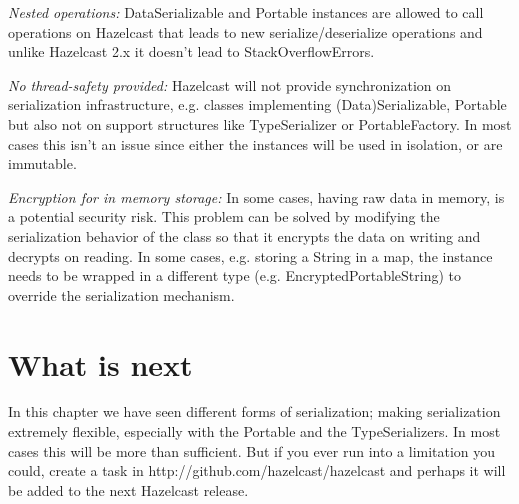 \emph{Nested operations:} DataSerializable and Portable instances are allowed to call operations on Hazelcast that leads to new serialize/deserialize operations and unlike Hazelcast 2.x it doesn't lead to StackOverflowErrors.

\emph{No thread-safety provided:} Hazelcast will not provide synchronization on serialization infrastructure, e.g. classes implementing (Data)Serializable, Portable but also not on support structures like TypeSerializer or PortableFactory. In most cases this isn't an issue since either the instances will be used in isolation, or are immutable.

\emph{Encryption for in memory storage:} In some cases, having raw data in memory, is a potential security risk. This problem can be solved by modifying the serialization behavior of the class so that it encrypts the data on writing and decrypts on reading. In some cases, e.g. storing a String in a map, the instance needs to be wrapped in a different type (e.g. EncryptedPortableString) to override the serialization mechanism.

\section{What is next}
In this chapter we have seen different forms of serialization; making serialization extremely flexible, especially with the Portable and the TypeSerializers. In most cases this will be more than sufficient. But if you ever run into a limitation you could, create a task in http://github.com/hazelcast/hazelcast and perhaps it will be added to the next Hazelcast release.